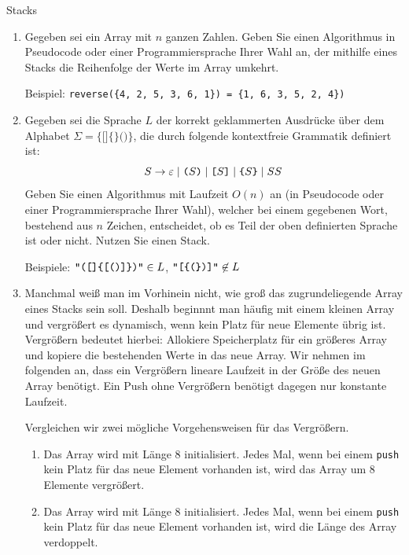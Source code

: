 \documentclass[11pt,a4paper]{article}
\begin{document}
\begin{aufgabe}{3}{Stacks}
    \begin{enumerate}
        \item
        Gegeben sei ein Array mit $n$ ganzen Zahlen.
        Geben Sie einen Algorithmus in Pseudocode oder einer Programmiersprache Ihrer Wahl an, der mithilfe eines Stacks die Reihenfolge der Werte im Array umkehrt.

        Beispiel: \texttt{reverse(\{4, 2, 5, 3, 6, 1\}) = \{1, 6, 3, 5, 2, 4\})}


        \item \hard Gegeben sei die Sprache $L$ der korrekt geklammerten Ausdrücke über dem Alphabet $\Sigma = \{\texttt{[]\{\}()}\}$, die durch folgende kontextfreie Grammatik definiert ist:
        \begin{equation*}
            S \rightarrow
            \epsilon \mid
            \text{\texttt{(}}S\text{\texttt{)}} \mid
            \text{\texttt{[}}S\text{\texttt{]}} \mid
            \text{\texttt{\{}}S\text{\texttt{\}}} \mid
            SS
        \end{equation*}
        Geben Sie einen Algorithmus mit Laufzeit $O(n)$ an (in Pseudocode oder einer Programmiersprache Ihrer Wahl), welcher bei einem gegebenen Wort, bestehend aus $n$ Zeichen, entscheidet, ob es Teil der oben definierten Sprache ist oder nicht.
        Nutzen Sie einen Stack.

        Beispiele: $\text{\texttt{"([]\{[()]\})"}} \in L$, $\text{\texttt{"[\{(\})]"}} \not\in L$

        \item \hard
        Manchmal weiß man im Vorhinein nicht, wie groß das zugrundeliegende Array eines Stacks sein soll.
        Deshalb beginnnt man häufig mit einem \glqq{}kleinen\grqq{} Array und vergrößert es dynamisch, wenn kein Platz für neue Elemente übrig ist.
        Vergrößern bedeutet hierbei: Allokiere Speicherplatz für ein größeres Array und kopiere die bestehenden Werte in das neue Array.
        Wir nehmen im folgenden an, dass ein Vergrößern lineare Laufzeit in der Größe des neuen Array benötigt.
        Ein Push ohne Vergrößern benötigt dagegen nur konstante Laufzeit.

        Vergleichen wir zwei mögliche Vorgehensweisen für das Vergrößern.
        \begin{enumerate}[label=(\roman*)]
            \item Das Array wird mit Länge 8 initialisiert.
            Jedes Mal, wenn bei einem \texttt{push} kein Platz für das neue Element vorhanden ist, wird das Array um 8 Elemente vergrößert.
            \item Das Array wird mit Länge 8 initialisiert.
            Jedes Mal, wenn bei einem \texttt{push} kein Platz für das neue Element vorhanden ist, wird die Länge des Array verdoppelt.
        \end{enumerate}


\end{enumerate}
\end{aufgabe}
\end{document}

